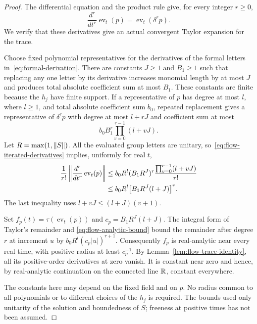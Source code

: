 \begin{proof}
The differential equation and the product rule give, for every
integer $r\geq0$,
\begin{equation}
 \frac{d^r}{dt^r}\operatorname{ev}_t(p)
 =\operatorname{ev}_t(\delta^r p).
 \label{eq:flow-iterated-derivatives}
\end{equation}
We verify that these derivatives give an actual convergent
Taylor expansion for the trace.

Choose fixed polynomial representatives for the derivatives
of the formal letters in~\eqref{eq:formal-derivation}. There
are constants $J\geq1$ and $B_1\geq1$ such that replacing any
one letter by its derivative increases monomial length by at
most $J$ and produces total absolute coefficient sum at most
$B_1$. These constants are finite because the $h_j$ have finite
support. If a representative of $p$ has degree at most $l$, where
$l\geq1$, and total absolute coefficient sum $b_0$, repeated
replacement gives a representative of $\delta^r p$ with degree
at most $l+rJ$ and coefficient sum at most
\[
 b_0 B_1^r\prod_{v=0}^{r-1}(l+vJ).
\]
Let $R=\max(1,\left\lVert S\right\rVert)$. All the evaluated group letters are
unitary, so~\eqref{eq:flow-iterated-derivatives} implies, uniformly
for real $t$,
\begin{align}
 \frac{1}{r!}
 \left\|\frac{d^r}{dt^r}\operatorname{ev}_t(p)\right\|
 &\leq b_0R^l(B_1R^J)^r
       \frac{\prod_{v=0}^{r-1}(l+vJ)}{r!} \notag\\
 &\leq b_0R^l\bigl[B_1R^J(l+J)\bigr]^r.
 \label{eq:flow-analytic-bound}
\end{align}
The last inequality uses $l+vJ\leq(l+J)(v+1)$.

Set $f_p(t)=\tau(\operatorname{ev}_t(p))$ and
$c_p=B_1R^J(l+J)$. The integral form of Taylor's remainder and
\eqref{eq:flow-analytic-bound} bound the remainder after degree
$r$ at increment $u$ by $b_0R^l(c_p|u|)^{r+1}$. Consequently
$f_p$ is real-analytic near every real time, with positive
radius at least $c_p^{-1}$. By
Lemma~\ref{lem:flow-trace-identity}, all its positive-order
derivatives at zero vanish. It is constant near zero and hence,
by real-analytic continuation on the connected line $\mathbb R$,
constant everywhere.

The constants here may depend on the fixed field and on $p$.
No radius common to all polynomials or to different choices of
the $h_j$ is required. The bounds used only unitarity of the
solution and boundedness of $S$; freeness at positive times has
not been assumed.
\end{proof}


